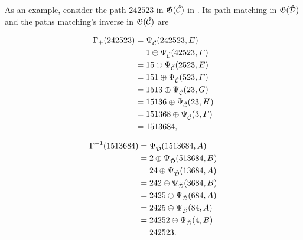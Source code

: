As an example, consider the path $242523$ in $\mathfrak{G}(\check{\mathcal{C}})$ in . Its path matching in $\mathfrak{G}(\check{\mathcal{D}})$ and the paths matching's inverse in $\mathfrak{G}(\check{\mathcal{C}})$ are
\begin{center}
\noindent\begin{minipage}{.46\linewidth}
\begin{align*}
    \Gamma_+(242523) &= \Psi_{\check{\mathcal{C}}}(242523, E) \\
    &= 1 \oplus \Psi_{\check{\mathcal{C}}}(42523, F)\\
    &= 15 \oplus \Psi_{\check{\mathcal{C}}}(2523, E)\\
    &= 151 \oplus \Psi_{\check{\mathcal{C}}}(523, F)\\
    &= 1513 \oplus \Psi_{\check{\mathcal{C}}}(23, G)\\
    &= 15136 \oplus \Psi_{\check{\mathcal{C}}}(23, H)\\
    &= 151368 \oplus \Psi_{\check{\mathcal{C}}}(3, F)\\
    &= 1513684,
\end{align*}
\end{minipage}%
\begin{minipage}{.46\linewidth}
\begin{align*}
    \Gamma_+^{-1}(1513684) &= \Psi_{\check{\mathcal{D}}}(1513684,A)\\
    &= 2 \oplus \Psi_{\check{\mathcal{D}}}(513684,B)\\
    &= 24 \oplus \Psi_{\check{\mathcal{D}}}(13684,A)\\
    &= 242 \oplus \Psi_{\check{\mathcal{D}}}(3684,B)\\
    &= 2425 \oplus \Psi_{\check{\mathcal{D}}}(684,A)\\
    &= 2425 \oplus \Psi_{\check{\mathcal{D}}}(84,A)\\
    &= 24252 \oplus \Psi_{\check{\mathcal{D}}}(4,B)\\
    &= 242523.
\end{align*}
\end{minipage}
\end{center}


